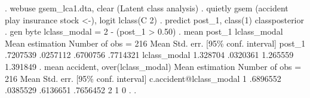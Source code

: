 . webuse gsem_lca1.dta, clear
(Latent class analysis)
{\smallskip}
. quietly gsem (accident play insurance stock <-), logit lclass(C 2)
{\smallskip}
. predict post_1, class(1) classposterior
{\smallskip}
. gen byte lclass_modal = 2 - (post_1 > 0.50)
{\smallskip}
. mean post_1 lclass_modal
{\smallskip}
Mean estimation                            Number of obs = 216
{\smallskip}
             {\VBAR}       Mean   Std. err.     [95\% conf. interval]
      post_1 {\VBAR}   .7207539   .0257112      .6700756    .7714321
lclass_modal {\VBAR}   1.328704   .0320361      1.265559    1.391849
{\smallskip}
. mean accident, over(lclass_modal)
{\smallskip}
Mean estimation                                       Number of obs = 216
{\smallskip}
                        {\VBAR}       Mean   Std. err.     [95\% conf. interval]
c.accident@lclass_modal {\VBAR}
                     1  {\VBAR}   .6896552   .0385529      .6136651    .7656452
                     2  {\VBAR}          1          0             .           .
